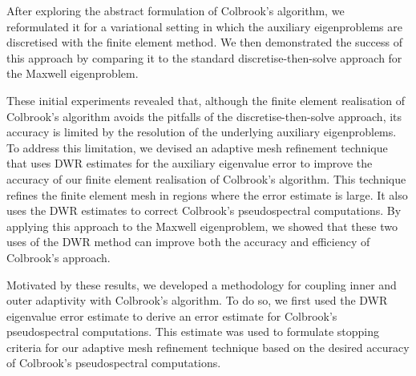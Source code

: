 After exploring the abstract formulation of Colbrook’s algorithm, we reformulated it for a variational setting in which the auxiliary eigenproblems are discretised with the finite element method. We then demonstrated the success of this approach by comparing it to the standard discretise-then-solve approach for the Maxwell eigenproblem. 




These initial experiments revealed that, although the finite element realisation of Colbrook's algorithm avoids the pitfalls of the discretise-then-solve approach, its accuracy is limited by the resolution of the underlying auxiliary eigenproblems. 
To address this limitation, we devised an adaptive mesh refinement technique that uses DWR estimates for the auxiliary eigenvalue error to improve the accuracy of our finite element realisation of Colbrook's algorithm. This technique refines the finite element mesh in regions where the error estimate is large. It also uses the DWR estimates to correct Colbrook's pseudospectral computations. By applying this approach to the Maxwell eigenproblem, we showed that these two uses of the DWR method can improve both the accuracy and efficiency of Colbrook's approach.


Motivated by these results, we developed a methodology for coupling inner and outer adaptivity with  Colbrook's algorithm.
To do so, we first used the DWR eigenvalue error estimate to derive an error estimate for Colbrook's pseudospectral computations. This estimate was used to formulate stopping criteria for our adaptive mesh refinement technique based on the desired accuracy of Colbrook's pseudospectral computations.


